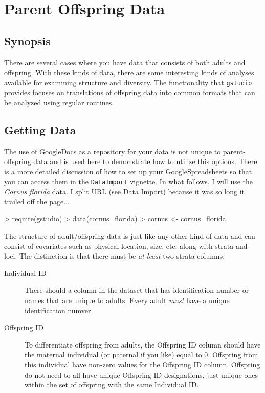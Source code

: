 \documentclass[letterpaper,twoside,openany]{book}
\begin{document}
\chapter{Parent Offspring Data}

\section{Synopsis}

There are several cases where you have data that consists of both adults and offspring.  With these kinds of data, there are some interesting kinds of analyses available for examining structure and diversity.  The functionality that \texttt{gstudio} provides focuses on translations of offspring data into common formats that can be analyzed using regular routines.


\section{Getting Data}

The use of GoogleDocs as a repository for your data is not unique to parent-offspring data and is used here to demonstrate how to utilize this options.  There is a more detailed discussion of how to set up your GoogleSpreadsheets so that you can access them in the \texttt{DataImport} vignette.  In what follows, I will use the \emph{Cornus florida} data.  I split URL (see Data Import) because it was so long it trailed off the page...  

\begin{Schunk}
\begin{Sinput}
> require(gstudio)
> data(cornus_florida)
> cornus <- cornus_florida
\end{Sinput}
\end{Schunk}

The structure of adult/offspring data is just like any other kind of data and can consist of covariates such as physical location, size, etc. along with strata and loci.  The distinction is that there must be \emph{at least} two strata columns:
\begin{description}
	\item[Individual ID] There should a column in the dataset that has identification number or names that are unique to adults.  Every adult \emph{must} have a unique identification numver.
	\item[Offspring ID] To differentiate offspring from adults, the Offspring ID column should have the maternal individual (or paternal if you like) equal to 0.  Offspring from this individual have non-zero values for the Offspring ID column.  Offspring do not need to all have unique Offspring ID designations, just unique ones within the set of offspring with the same Individual ID.  
\end{description}
\end{document}
